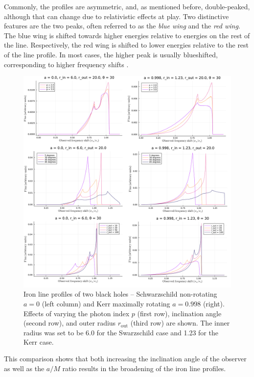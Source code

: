 \documentclass[fleqn,usenatbib,useAMS]{mnras}
\begin{document}
Commonly, the profiles are asymmetric, and, as mentioned before, double-peaked, although that can change due to relativistic effects at play. Two distinctive features are the two peaks, often referred to as the \textit{blue wing} and the \textit{red wing}. The blue wing is shifted towards higher energies relative to energies on the rest of the line. Respectively, the red wing is shifted to lower energies relative to the rest of the line profile. In most cases, the higher peak is usually blueshifted, corresponding to higher frequency shifts \cite{fanton1997detecting}. 

\begin{figure}
    \centering
    \includegraphics[width=0.98\linewidth]{figures/fanton.png}
    \caption{Iron line profiles of two black holes -- Schwarzschild non-rotating $a = 0$ (left column) and Kerr maximally rotating $a = 0.998$ (right). Effects of varying the photon index $p$ (first row), inclination angle (second row), and outer radius $r_{\text{out}}$ (third row) are shown. The inner radius was set to be 6.0 for the Swarzschild case and 1.23 for the Kerr case.}
    \label{fanton}
\end{figure}

This comparison shows that both increasing the inclination angle of the observer as well as the $a/M$ ratio results in the broadening of the iron line profiles.
\end{document}
